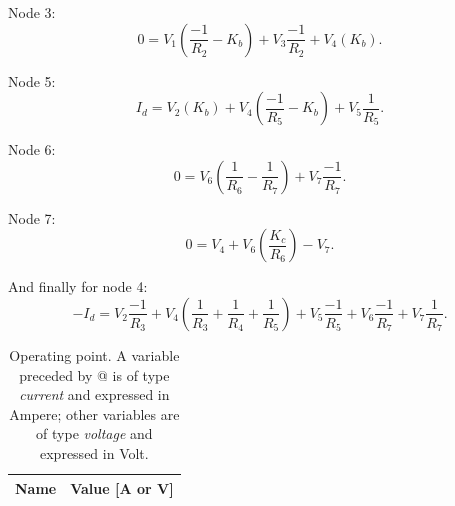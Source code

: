 Node 3:
\begin{equation}
	0 = V_1(\frac{-1}{R_2} - K_b) + V_3\frac{-1}{R_2} + V_4(K_b).
\end{equation}

Node 5:
\begin{equation}
	I_d = V_2(K_b) + V_4(\frac{-1}{R_5} - K_b) + V_5\frac{1}{R_5}.
\end{equation}

Node 6:
\begin{equation}
	0 = V_6(\frac{1}{R_6} - \frac{1}{R_7}) + V_7\frac{-1}{R_7} .
\end{equation}

Node 7:
\begin{equation}
	0 = V_4 + V_6(\frac{K_c}{R_6}) - V_7 .
\end{equation}

And finally for node 4:
\begin{equation}
	-I_d = V_2\frac{-1}{R_3} + V_4(\frac{1}{R_3} + \frac{1}{R_4} + \frac{1}{R_5}) + V_5\frac{-1}{R_5} + V_6\frac{-1}{R_7} + V_7\frac{1}{R_7}.
\end{equation}

\begin{table}[h]
  \centering
  \begin{tabular}{|l|r|}
    \hline    
    {\bf Name} & {\bf Value [A or V]} \\ \hline
    
  \end{tabular}
  \caption{Operating point. A variable preceded by @ is of type {\em current}
    and expressed in Ampere; other variables are of type {\it voltage} and expressed in
    Volt.}
  \label{tab:op}
\end{table}


